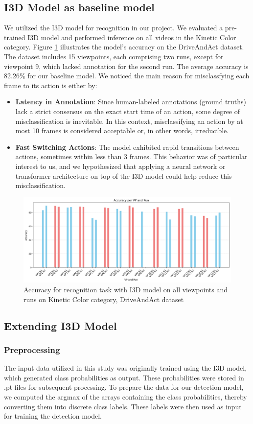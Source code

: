 \documentclass{article}
\begin{document}
\subsection{I3D Model as baseline model}
We utilized the I3D model for recognition in our project. We evaluated a pre-trained I3D model and performed inference on all videos in the Kinetic Color category. Figure \ref{fig:i3d-acc} illustrates the model's accuracy on the DriveAndAct dataset. The dataset includes 15 viewpoints, each comprising two runs, except for viewpoint 9, which lacked annotation for the second run. The average accuracy is 82.26\% for our baseline model.
We noticed the main reason for misclassfying each frame to its action is either by:
\begin{itemize}
    \item \textbf{Latency in Annotation}: Since human-labeled annotations (ground truths) lack a strict consensus on the exact start time of an action, some degree of misclassification is inevitable. In this context, misclassifying an action by at most 10 frames is considered acceptable or, in other words, irreducible.
    \item \textbf{Fast Switching Actions}: The model exhibited rapid transitions between actions, sometimes within less than 3 frames. This behavior was of particular interest to us, and we hypothesized that applying a neural network or transformer architecture on top of the I3D model could help reduce this misclassification.
\end{itemize}
\begin{figure}[h]
    \centering
    \includegraphics[width=0.9\linewidth]{figs/i3d-acc.png}
    \caption{Accuracy for recognition task with I3D model on all viewpoints and runs on Kinetic Color category, DriveAndAct dataset}
    \label{fig:i3d-acc}
\end{figure}
\subsection{Extending I3D Model}
\subsubsection{Preprocessing}
The input data utilized in this study was originally trained using the I3D model, which generated class probabilities as output. These probabilities were stored in .pt files for subsequent processing. To prepare the data for our detection model, we computed the argmax of the arrays containing the class probabilities, thereby converting them into discrete class labels. These labels were then used as input for training the detection model.
\end{document}
